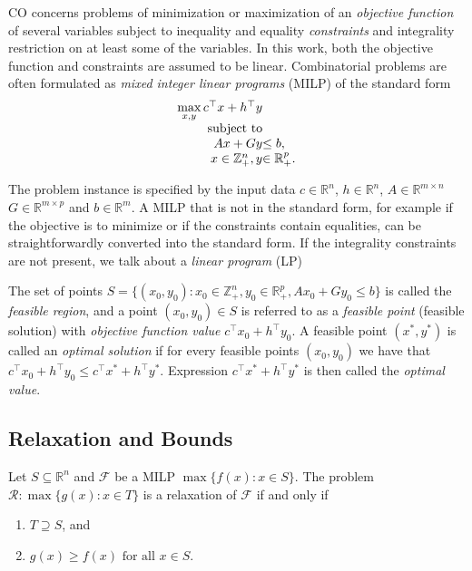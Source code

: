 CO concerns problems of minimization or maximization of an \emph{objective function} of several variables 
subject to inequality and equality \emph{constraints} and integrality restriction on at least some of the variables.
In this work, both the objective function and constraints are assumed to be linear.
Combinatorial problems are often formulated as \emph{mixed integer linear programs} (MILP) of the standard form
\begin{equation}
\begin{array}{r@{}l}
	\max\limits_{x,y}c^\top x + h^\top y & \\
	\text{subject to}& \\
	  Ax + Gy &\leq b, \\
	  x \in \mathbb{Z}^{n}_+, y & \in\mathbb{R}^{p}_+. 
\end{array}
\end{equation}

The problem instance is specified by the input data $c\in \mathbb{R}^n$, $h \in \mathbb{R}^n$, $A \in \mathbb{R}^{m\times n}$  $G \in\mathbb{R}^{m\times p}$ and $b \in \mathbb{R}^m$.
A MILP that is not in the standard form, for example if the objective is to minimize or if the constraints contain equalities, can be straightforwardly converted into the standard form.
If the integrality constraints are not present, we talk about a \emph{linear program} (LP)


The set of points $S=\{(x_0,y_0):  x_0 \in \mathbb{Z}^{n}_+, y_0  \in\mathbb{R}^{p}_+, Ax_0 + Gy_0 \leq b\}$ is called the \emph{feasible region},  
and a point $(x_0,y_0)\in S$ is referred to as a \emph{feasible point} (feasible solution) with \emph{objective function value} $c^\top x_0 + h^\top y_0$. 
A feasible point $(x^*,y^*)$ is called an \emph{optimal solution} if for every feasible points $(x_0,y_0)$ we have that $c^\top x_0 + h^\top y_0 \leq c^\top x^* + h^\top y^*$. 
Expression $c^\top x^* + h^\top y^*$ is then called the \emph{optimal value}. 

\subsection{Relaxation and Bounds}

\begin{definition}
	Let $S\subseteq \mathbb{R}^n$ and $\mathcal{F}$ be a MILP $\max\{f(x):x\in S\}$.
	The problem $\mathcal{R}: \max\{g(x):x\in T\}$ is a relaxation of $\mathcal{F}$ if and only if
	\begin{enumerate}
		\item $T\supseteq S$, and
		\item $g(x)\geq f(x) \text{ for all } x\in S$.
	\end{enumerate}
\end{definition}


